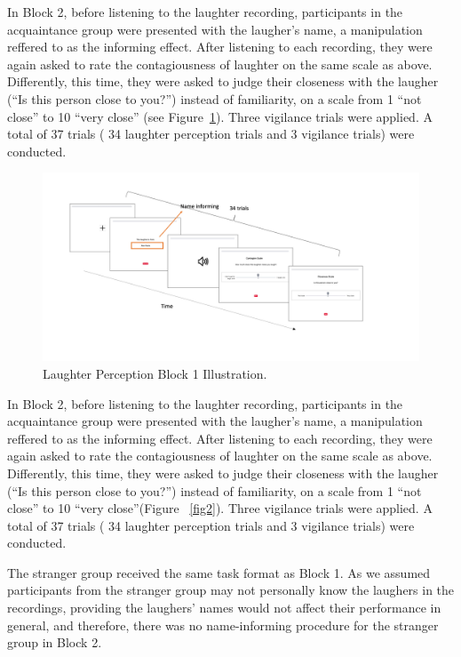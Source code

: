 In Block 2, before listening to the laughter recording, participants in the acquaintance group were presented with the laugher’s name, a manipulation reffered to as the informing effect. After listening to each recording, they were again asked to rate the contagiousness of laughter on the same scale as above. Differently, this time, they were asked to judge their closeness with the laugher (“Is this person close to you?”) instead of familiarity, on a scale from 1 “not close” to 10 “very close” (see Figure~\ref{fig1}). Three vigilance trials were applied. A total of 37 trials ( 34 laughter perception trials and 3 vigilance trials) were conducted.

\begin{figure}[h!] 
\centering
\includegraphics[width=1\textwidth]{Slide2.jpeg}
\caption{\label{fig1}Laughter Perception Block 1 Illustration.}
\end{figure}

In Block 2, before listening to the laughter recording, participants in the acquaintance group were presented with the laugher’s name, a manipulation reffered to as the informing effect. After listening to each recording, they were again asked to rate the contagiousness of laughter on the same scale as above. Differently, this time, they were asked to judge their closeness with the laugher (“Is this person close to you?”) instead of familiarity, on a scale from 1 “not close” to 10 “very close”(Figure ~\ref{fig2}). Three vigilance trials were applied. A total of 37 trials ( 34 laughter perception trials and 3 vigilance trials) were conducted.

The stranger group received the same task format as Block 1. As we assumed participants from the stranger group may not personally know the laughers in the recordings, providing the laughers’ names would not affect their performance in general, and therefore, there was no name-informing procedure for the stranger group in Block 2.

